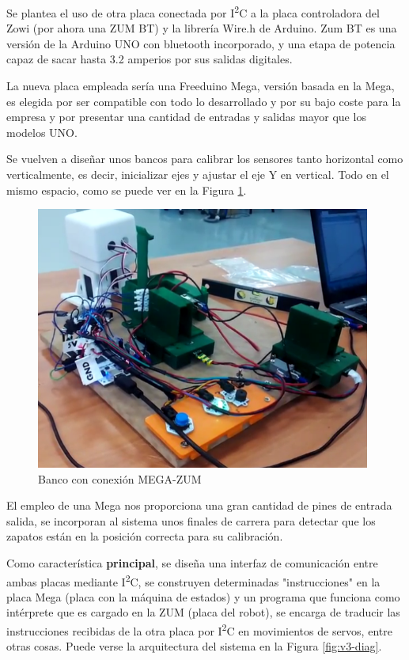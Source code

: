 Se plantea el uso de otra placa conectada por I\textsuperscript{2}C a la placa controladora del Zowi (por ahora una ZUM BT) y la librería Wire.h de Arduino. Zum BT es una versión de la Arduino UNO con bluetooth incorporado, y una etapa de potencia capaz de sacar hasta 3.2 amperios por sus salidas digitales.

La nueva placa empleada sería una Freeduino Mega, versión basada en la Mega, es elegida por ser compatible con todo lo desarrollado y por su bajo coste para la empresa y por presentar una cantidad de entradas y salidas mayor que los modelos UNO.

Se vuelven a diseñar unos bancos para calibrar los sensores tanto horizontal como verticalmente, es decir, inicializar ejes y ajustar el eje Y en vertical. Todo en el mismo espacio, como se puede ver en la Figura \ref{fig:bancov3}.

\begin{figure}
\centering
\includegraphics[width=110mm]{Figures/banco_v3}
\caption[Banco con conexión MEGA-ZUM]{Banco con conexión MEGA-ZUM}
\label{fig:bancov3}
\end{figure}

El empleo de una Mega nos proporciona una gran cantidad de pines de entrada salida, se incorporan al sistema unos finales de carrera para detectar que los zapatos están en la posición correcta para su calibración.

Como característica \textbf{principal}, se diseña una interfaz de comunicación entre ambas placas mediante I\textsuperscript{2}C, se construyen determinadas "instrucciones" en la placa Mega (placa con la máquina de estados) y un programa que funciona como intérprete que es cargado en la ZUM (placa del robot), se encarga de traducir las instrucciones recibidas de la otra placa por I\textsuperscript{2}C en movimientos de servos, entre otras cosas. Puede verse la arquitectura del sistema en la Figura \ref{fig:v3-diag}.

